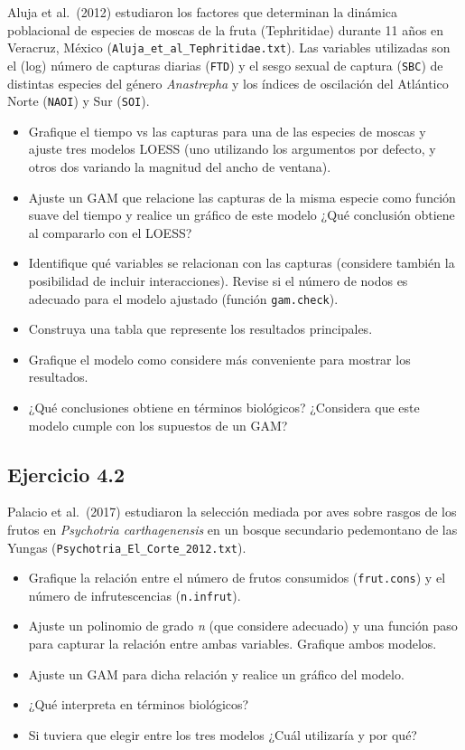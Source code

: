 \documentclass[
]{book}
\begin{document}
Aluja et al.~(2012) estudiaron los factores que determinan la dinámica poblacional de especies de moscas de la fruta (Tephritidae) durante 11 años en Veracruz, México (\texttt{Aluja\_et\_al\_Tephritidae.txt}). Las variables utilizadas son el (log) número de capturas diarias (\texttt{FTD}) y el sesgo sexual de captura (\texttt{SBC}) de distintas especies del género \emph{Anastrepha} y los índices de oscilación del Atlántico Norte (\texttt{NAOI}) y Sur (\texttt{SOI}).

\begin{itemize}
\item
  Grafique el tiempo vs las capturas para una de las especies de moscas y ajuste tres modelos LOESS (uno utilizando los argumentos por defecto, y otros dos variando la magnitud del ancho de ventana).
\item
  Ajuste un GAM que relacione las capturas de la misma especie como función suave del tiempo y realice un gráfico de este modelo ¿Qué conclusión obtiene al compararlo con el LOESS?
\item
  Identifique qué variables se relacionan con las capturas (considere también la posibilidad de incluir interacciones). Revise si el número de nodos es adecuado para el modelo ajustado (función \texttt{gam.check}).
\item
  Construya una tabla que represente los resultados principales.
\item
  Grafique el modelo como considere más conveniente para mostrar los resultados.
\item
  ¿Qué conclusiones obtiene en términos biológicos? ¿Considera que este modelo cumple con los supuestos de un GAM?
\end{itemize}

\hypertarget{ejercicio-4.2}{%
\subsection{Ejercicio 4.2}\label{ejercicio-4.2}}

Palacio et al.~(2017) estudiaron la selección mediada por aves sobre rasgos de los frutos en \emph{Psychotria carthagenensis} en un bosque secundario pedemontano de las Yungas (\texttt{Psychotria\_El\_Corte\_2012.txt}).

\begin{itemize}
\item
  Grafique la relación entre el número de frutos consumidos (\texttt{frut.cons}) y el número de infrutescencias (\texttt{n.infrut}).
\item
  Ajuste un polinomio de grado \emph{n} (que considere adecuado) y una función paso para capturar la relación entre ambas variables. Grafique ambos modelos.
\item
  Ajuste un GAM para dicha relación y realice un gráfico del modelo.
\item
  ¿Qué interpreta en términos biológicos?
\item
  Si tuviera que elegir entre los tres modelos ¿Cuál utilizaría y por qué?
\end{itemize}
\end{document}
